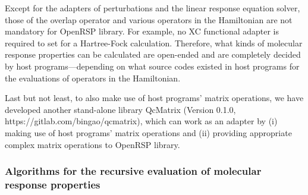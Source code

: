 \documentclass[%
 reprint,
 amsmath,amssymb,
 aps,
]{revtex4-1}
\begin{document}
Except for the adapters of perturbations and the linear response equation
solver, those of the overlap operator and various operators in the Hamiltonian
are not mandatory for OpenRSP library. For example, no XC functional adapter is
required to set for a Hartree-Fock calculation. Therefore, what kinds of
molecular response properties can be calculated are open-ended and are
completely decided by host programs---depending on what source codes existed in
host programs for the evaluations of operators in the Hamiltonian.

Last but not least, to also make use of host programs' matrix operations, we
have developed another stand-alone library QcMatrix (Version 0.1.0,
https://gitlab.com/bingao/qcmatrix), which can work as an adapter by (i) making
use of host programs' matrix operations and (ii) providing appropriate complex
matrix operations to OpenRSP library.

\subsubsection{Algorithms for the recursive evaluation of molecular response properties}
\label{subsubsection-recursive-algorithms}
\end{document}
